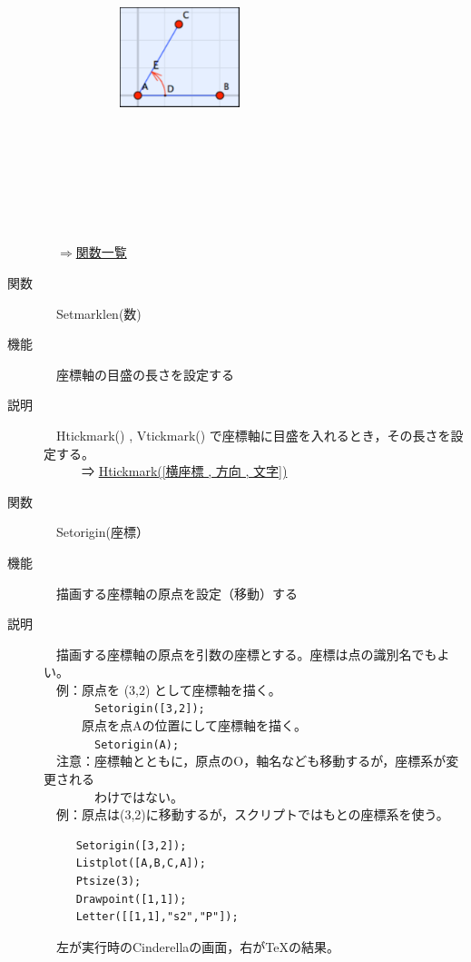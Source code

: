 \documentclass[papersize,a4paper,12pt,uplatex]{jsarticle}
\begin{document}
\begin{description}
　　　　　　\includegraphics[width=3.5cm,bb=0 0 161 134]{Fig/setcolor.pdf}
　\\
　\\
\scalebox{0.9}{}

\newpage
　\\
　\\
　\\
\scalebox{0.9}{}
　\\
　\\
\begin{flushright}　\hyperlink{functionlist}{$\Rightarrow$関数一覧}\end{flushright}
\newpage
\hypertarget{setmarklen}{}
\item[関数]　Setmarklen(数)　
\item[機能]　座標軸の目盛の長さを設定する
\item[説明]　Htickmark() , Vtickmark() で座標軸に目盛を入れるとき，その長さを設定する。 \\
 　　　⇒ \hyperlink{htickmark}{Htickmark([横座標 , 方向 , 文字])}\\

\hypertarget{setorigin}{}
\item[関数]　Setorigin(座標）  　　
\item[機能]　描画する座標軸の原点を設定（移動）する
\item[説明]　描画する座標軸の原点を引数の座標とする。座標は点の識別名でもよい。\\

　例：原点を (3,2) として座標軸を描く。\\
　　　　\verb|Setorigin([3,2]);|\\
　　　原点を点Aの位置にして座標軸を描く。\\
　　　　\verb|Setorigin(A);|  \\

　注意：座標軸とともに，原点のO，軸名なども移動するが，座標系が変更される\\
　　　　わけではない。\\

　例：原点は(3,2)に移動するが，スクリプトではもとの座標系を使う。
\begin{verbatim}
　　　Setorigin([3,2]);
　　　Listplot([A,B,C,A]);
　　　Ptsize(3);
　　　Drawpoint([1,1]);
　　　Letter([[1,1],"s2","P"]);
\end{verbatim}
　左が実行時のCinderellaの画面，右が\TeX の結果。\\


\end{description}
\end{document}
